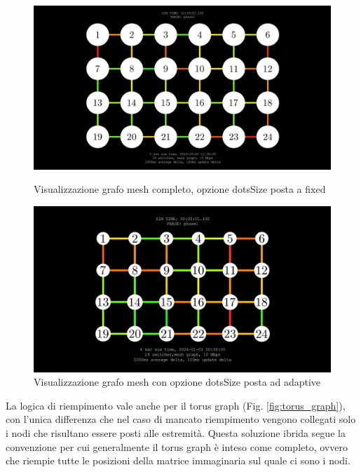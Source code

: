 \documentclass[binding=0.6cm]{sapthesis}
\begin{document}
\begin{figure}[h]
    \centering
    \begin{minipage}{0.48\textwidth}
      \includegraphics[width=\linewidth]{immagini/fixed_dots_mesh.JPG}
      \caption{Visualizzazione grafo mesh completo, opzione dotsSize posta a fixed}
      \label{fig:mesh_not_full}
    \end{minipage}\hfill
    \begin{minipage}{0.48\textwidth}
      \includegraphics[width=\linewidth]{immagini/adaptive_dots_mesh.JPG}
      \caption{Visualizzazione grafo mesh con opzione dotsSize posta ad adaptive}
      \label{fig:adaptive_dots_example}
    \end{minipage}
\end{figure}

La logica di riempimento vale anche per il torus graph (Fig. \ref{fig:torus_graph}), con l'unica differenza che nel caso di mancato riempimento vengono collegati solo i nodi
che risultano essere posti alle estremità. Questa soluzione ibrida segue la convenzione per cui generalmente il torus graph è inteso come completo,
ovvero che riempie tutte le posizioni della matrice immaginaria sul quale ci sono i nodi.
\end{document}
